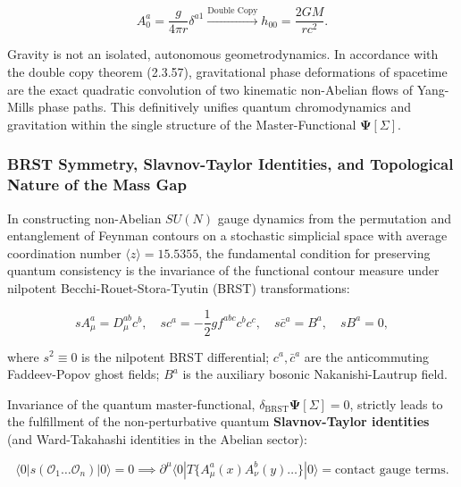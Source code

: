 \begin{equation}\label{eq:2.3.59}\tag{2.3.59}
A_0^a = \frac{g}{4\pi r} \delta^{a1} \xrightarrow{\text{Double Copy}} h_{00} = \frac{2 G M}{r c^2}.
\end{equation}

\begin{theorem}\label{thm:2.3.6}
Gravity is not an isolated, autonomous geometrodynamics. In accordance with the double copy theorem (2.3.57), gravitational phase deformations of spacetime are the exact quadratic convolution of two kinematic non-Abelian flows of Yang-Mills phase paths. This definitively unifies quantum chromodynamics and gravitation within the single structure of the Master-Functional $\mathbf{\Psi}[\Sigma]$.
\end{theorem}

\subsubsection{BRST Symmetry, Slavnov-Taylor Identities, and Topological Nature of the Mass Gap}\label{sec:2.3.10}

In constructing non-Abelian $SU(N)$ gauge dynamics from the permutation and entanglement of Feynman contours on a stochastic simplicial space with average coordination number $\langle z \rangle = 15.5355$, the fundamental condition for preserving quantum consistency is the invariance of the functional contour measure under nilpotent Becchi-Rouet-Stora-Tyutin (BRST) transformations:

\begin{equation}\label{eq:2.3.60}\tag{2.3.60}
s A_\mu^a = D_\mu^{ab} c^b, \quad s c^a = -\frac{1}{2} g f^{abc} c^b c^c, \quad s \bar{c}^a = B^a, \quad s B^a = 0,
\end{equation}

where $s^2 \equiv 0$ is the nilpotent BRST differential;  
$c^a, \bar{c}^a$ are the anticommuting Faddeev-Popov ghost fields;  
$B^a$ is the auxiliary bosonic Nakanishi-Lautrup field.

Invariance of the quantum master-functional, $\delta_{\text{BRST}} \mathbf{\Psi}[\Sigma] = 0$, strictly leads to the fulfillment of the non-perturbative quantum \textbf{Slavnov-Taylor identities} (and Ward-Takahashi identities in the Abelian sector):

\begin{equation}\label{eq:2.3.61}\tag{2.3.61}
\langle 0 | s \left( \mathcal{O}_1 \dots \mathcal{O}_n \right) | 0 \rangle = 0 \implies \partial^\mu \langle 0 | T \{ A_\mu^a(x) A_\nu^b(y) \dots \} | 0 \rangle = \text{contact gauge terms}.
\end{equation}

